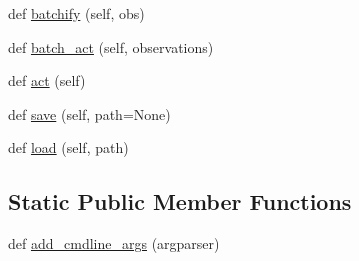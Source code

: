 \begin{DoxyCompactItemize}
\item 
def \hyperlink{classparlai_1_1agents_1_1legacy__agents_1_1memnn_1_1memnn__v0_1_1MemnnAgent_afaa379fa31bcc83bd467d15e2976d0a3}{batchify} (self, obs)
\item 
def \hyperlink{classparlai_1_1agents_1_1legacy__agents_1_1memnn_1_1memnn__v0_1_1MemnnAgent_ad73ed6e730b608491c2d8ef3ad25e32a}{batch\+\_\+act} (self, observations)
\item 
def \hyperlink{classparlai_1_1agents_1_1legacy__agents_1_1memnn_1_1memnn__v0_1_1MemnnAgent_a7079216ce7367ba0ca3ac205daa516c4}{act} (self)
\item 
def \hyperlink{classparlai_1_1agents_1_1legacy__agents_1_1memnn_1_1memnn__v0_1_1MemnnAgent_a20509f6931e68ff52e965d3e214c7b0a}{save} (self, path=None)
\item 
def \hyperlink{classparlai_1_1agents_1_1legacy__agents_1_1memnn_1_1memnn__v0_1_1MemnnAgent_a43e08459f9552c66ef389b8727b8eff3}{load} (self, path)
\end{DoxyCompactItemize}
\subsection*{Static Public Member Functions}
\begin{DoxyCompactItemize}
\item 
def \hyperlink{classparlai_1_1agents_1_1legacy__agents_1_1memnn_1_1memnn__v0_1_1MemnnAgent_a3ca2bd7b5cbce5ebac978deeb2ce9e10}{add\+\_\+cmdline\+\_\+args} (argparser)
\end{DoxyCompactItemize}
